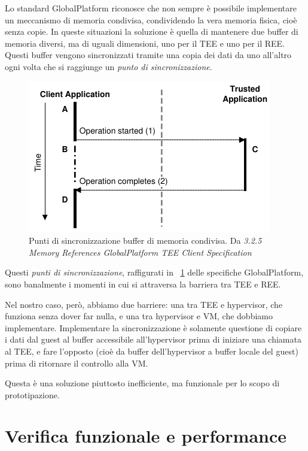 \documentclass[12pt,italian]{report}
\begin{document}
Lo standard GlobalPlatform riconosce che non sempre è possibile implementare
un  meccanismo di memoria condivisa, condividendo la vera memoria fisica,
cioè senza copie.
In queste situazioni la soluzione è quella di mantenere due buffer di memoria
diversi, ma di uguali dimensioni, uno per il TEE e uno per il REE.
Questi buffer vengono sincronizzati tramite una copia dei dati da uno all'altro
ogni volta che si raggiunge un \textit{punto di sincronizzazione}.

\begin{figure}[h]
    \centering
    \includegraphics{immagini/tp-synchronization-points}
    \caption{
        Punti di sincronizzazione buffer di memoria condivisa.
        Da \textit{
            3.2.5 Memory References GlobalPlatform TEE Client Specification
        }
    }
    \label{fig:gp-punti-sincronizzazione}
\end{figure}

Questi \textit{punti di sincronizzazione}, raffigurati in
\figurename~\ref{fig:gp-punti-sincronizzazione} delle specifiche GlobalPlatform,
sono banalmente i momenti in cui si attraversa la barriera tra TEE e REE.

Nel nostro caso, però, abbiamo due barriere: una tra TEE e hypervisor,
che funziona
senza dover far nulla, e una tra hypervisor e VM, che dobbiamo implementare.
Implementare la sincronizzazione è solamente questione di copiare i dati dal
guest al buffer accessibile all'hypervisor prima di iniziare una chiamata
al TEE, e fare l'opposto (cioè da buffer dell'hypervisor a buffer locale
del guest) prima di ritornare il controllo alla VM.

Questa è una soluzione piuttosto inefficiente, ma funzionale per lo scopo di
prototipazione.

\section{Verifica funzionale e performance}
\label{sec:verifica-funzionale-e-performance}
\end{document}
